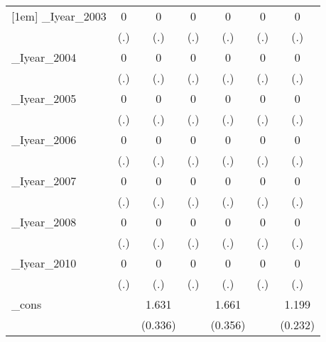 \begin{table}[htbp]
\begin{tabular}{l*{6}{c}}
[1em]
\_Iyear\_2003&        0         &        0         &        0         &        0         &        0         &        0         \\
          &      (.)         &      (.)         &      (.)         &      (.)         &      (.)         &      (.)         \\
[1em]
\_Iyear\_2004&        0         &        0         &        0         &        0         &        0         &        0         \\
          &      (.)         &      (.)         &      (.)         &      (.)         &      (.)         &      (.)         \\
[1em]
\_Iyear\_2005&        0         &        0         &        0         &        0         &        0         &        0         \\
          &      (.)         &      (.)         &      (.)         &      (.)         &      (.)         &      (.)         \\
[1em]
\_Iyear\_2006&        0         &        0         &        0         &        0         &        0         &        0         \\
          &      (.)         &      (.)         &      (.)         &      (.)         &      (.)         &      (.)         \\
[1em]
\_Iyear\_2007&        0         &        0         &        0         &        0         &        0         &        0         \\
          &      (.)         &      (.)         &      (.)         &      (.)         &      (.)         &      (.)         \\
[1em]
\_Iyear\_2008&        0         &        0         &        0         &        0         &        0         &        0         \\
          &      (.)         &      (.)         &      (.)         &      (.)         &      (.)         &      (.)         \\
[1em]
\_Iyear\_2010&        0         &        0         &        0         &        0         &        0         &        0         \\
          &      (.)         &      (.)         &      (.)         &      (.)         &      (.)         &      (.)         \\
[1em]
\_cons    &                  &    1.631\sym{***}&                  &    1.661\sym{***}&                  &    1.199\sym{***}\\
          &                  &  (0.336)         &                  &  (0.356)         &                  &  (0.232)         \\

\end{tabular}
\end{table}
